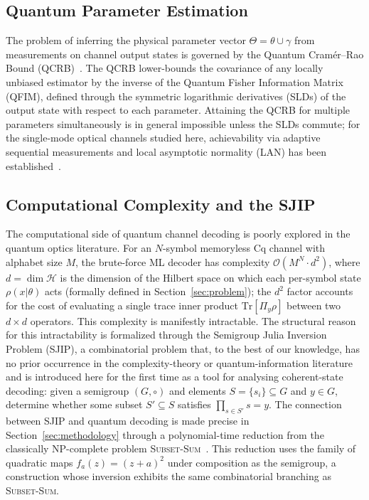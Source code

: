 \documentclass[journal,twocolumn]{IEEEtran}
\theoremstyle{definition}
\theoremstyle{plain}
\newcommand{\calH}{\mathcal{H}}
\newcommand{\Tr}{\mathrm{Tr}}
\begin{document}
\subsection{Quantum Parameter Estimation}
The problem of inferring the physical parameter vector
$\Theta = \theta \cup \gamma$ from measurements on channel output
states is governed by the Quantum Cram\'{e}r--Rao Bound
(QCRB)~\cite{helstrom1976,holevo2011,paris2009}.  The QCRB
lower-bounds the covariance of any locally unbiased estimator by the
inverse of the Quantum Fisher Information Matrix (QFIM), defined
through the symmetric logarithmic derivatives (SLDs) of the output
state with respect to each parameter.  Attaining the QCRB for
multiple parameters simultaneously is in general impossible unless
the SLDs commute; for the single-mode optical channels studied here,
achievability via adaptive sequential measurements and local
asymptotic normality (LAN) has been established~\cite{giovannetti2011}.

\subsection{Computational Complexity and the SJIP}

The computational side of quantum channel decoding is poorly
explored in the quantum optics literature.  For an $N$-symbol
memoryless Cq channel with alphabet size $M$, the brute-force ML
decoder has complexity $\mathcal{O}(M^N \cdot d^2)$, where $d =
\dim\calH$ is the dimension of the Hilbert space on which each
per-symbol state $\rho(x|\theta)$ acts (formally defined in
Section~\ref{sec:problem}); the $d^2$ factor accounts for the cost of
evaluating a single trace inner product $\Tr[\Pi_y\rho]$ between two
$d\times d$ operators. This complexity is manifestly intractable.  The structural reason for this intractability
is formalized through the Semigroup Julia Inversion Problem (SJIP),
a combinatorial problem that, to the best of our knowledge, has no
prior occurrence in the complexity-theory or quantum-information
literature and is introduced here for the first time as a tool for
analysing coherent-state decoding: given a semigroup $(G,\circ)$ and
elements $S = \{s_i\} \subseteq G$
and $y \in G$, determine whether some subset $S' \subseteq S$
satisfies $\prod_{s \in S'} s = y$.  The connection between SJIP
and quantum decoding is made precise in Section~\ref{sec:methodology}
through a polynomial-time reduction from the classically NP-complete
problem \textsc{Subset-Sum}~\cite{garey1979}.  This reduction uses
the family of quadratic maps $f_a(z) = (z+a)^2$ under composition
as the semigroup, a construction whose inversion exhibits the same
combinatorial branching as \textsc{Subset-Sum}.
\end{document}
